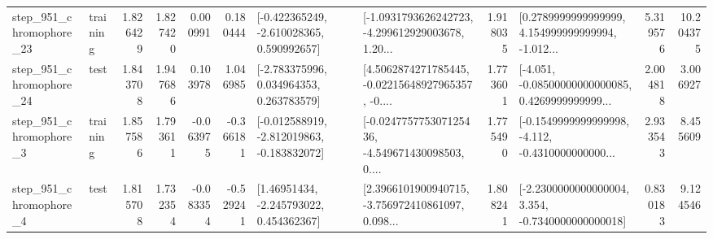 \begin{tabular}{llrrrrllrlrr}
  step\_951\_chromophore\_23 &  training &      1.826429 &    1.827420 &      0.000991 &  0.180444 &   [-0.422365249, -2.610028365, 0.590992657] &  [-1.0931793626242723, -4.299612929003678, 1.20... &       1.918035 &  [0.2789999999999999, 4.154999999999994, -1.012... &            5.319576 &         10.204375 \\
  step\_951\_chromophore\_24 &      test &      1.843708 &    1.947686 &      0.103978 &  1.046985 &    [-2.783375996, 0.034964353, 0.263783579] &  [4.5062874271785445, -0.02215648927965357, -0.... &       1.773601 &  [-4.051, -0.08500000000000085, 0.4269999999999... &            2.004818 &          3.006927 \\
   step\_951\_chromophore\_3 &  training &      1.857586 &    1.793611 &     -0.063975 & -0.366181 &  [-0.012588919, -2.812019863, -0.183832072] &  [-0.024775775307125436, -4.549671430098503, 0.... &       1.775490 &  [-0.1549999999999998, -4.112, -0.4310000000000... &            2.933543 &          8.455609 \\
   step\_951\_chromophore\_4 &      test &      1.815708 &    1.732354 &     -0.083354 & -0.529241 &     [1.46951434, -2.245793022, 0.454362367] &  [2.3966101900940715, -3.756972410861097, 0.098... &       1.808241 &  [-2.2300000000000004, 3.354, -0.7340000000000018] &            0.830183 &          9.124546 \\
\bottomrule
\end{tabular}

